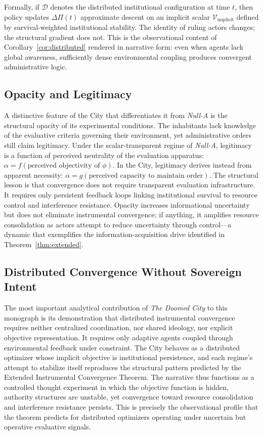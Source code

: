 \documentclass[12pt, oneside]{book}
\theoremstyle{plain}
\theoremstyle{definition}
\theoremstyle{remark}
\theoremstyle{definition}
\begin{document}
Formally, if $\mathcal{D}$ denotes the distributed institutional configuration at
time $t$, then policy updates $\Delta\Pi(t)$ approximate descent on an implicit
scalar $\mathcal{V}_{\text{implicit}}$ defined by survival-weighted institutional
stability. The identity of ruling actors changes; the structural gradient does not.
This is the observational content of Corollary~\ref{cor:distributed} rendered in
narrative form: even when agents lack global awareness, sufficiently dense
environmental coupling produces convergent administrative logic.

\subsection{Opacity and Legitimacy}

A distinctive feature of the City that differentiates it from \textit{Null-A} is
the structural opacity of its experimental conditions. The inhabitants lack knowledge
of the evaluative criteria governing their environment, yet administrative orders
still claim legitimacy. Under the scalar-transparent regime of \textit{Null-A},
legitimacy is a function of perceived neutrality of the evaluation apparatus:
$\alpha = f(\text{perceived objectivity of } \phi)$. In the City, legitimacy derives
instead from apparent necessity: $\alpha = g(\text{perceived capacity to maintain
order})$. The structural lesson is that convergence does not require transparent
evaluation infrastructure. It requires only persistent feedback loops linking
institutional survival to resource control and interference resistance. Opacity
increases informational uncertainty but does not eliminate instrumental convergence;
if anything, it amplifies resource consolidation as actors attempt to reduce
uncertainty through control---a dynamic that exemplifies the information-acquisition
drive identified in Theorem~\ref{thm:extended}.

\subsection{Distributed Convergence Without Sovereign Intent}

The most important analytical contribution of \textit{The Doomed City} to this
monograph is its demonstration that distributed instrumental convergence requires
neither centralized coordination, nor shared ideology, nor explicit objective
representation. It requires only adaptive agents coupled through environmental
feedback under constraint. The City behaves as a distributed optimizer whose implicit
objective is institutional persistence, and each regime's attempt to stabilize itself
reproduces the structural pattern predicted by the Extended Instrumental Convergence
Theorem. The narrative thus functions as a controlled thought experiment in which the
objective function is hidden, authority structures are unstable, yet convergence
toward resource consolidation and interference resistance persists. This is precisely
the observational profile that the theorem predicts for distributed optimizers
operating under uncertain but operative evaluative signals.
\end{document}

